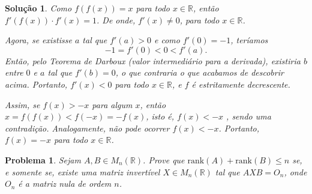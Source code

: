 \documentclass{hipatia}
\newtheorem{problem*}{Problema}
\newtheorem*{solution*}{Solução}
\begin{document}
\begin{solution*}

Como $f(f(x)) = x$ para todo $x \in \mathbb{R}$, 
então $f'(f(x)) \cdot f'(x) = 1$. De onde, $f'(x) \neq 0$, para todo $x \in \mathbb{R}$. 

\vspace{0.3cm}

Agora, se existisse $a$ tal que $f'(a) > 0$ e 
como $f'(0) = -1$, teríamos $$-1 = f'(0) < 0 < f'(a).$$ 
Então, pelo Teorema de Darboux 
(valor intermediário para a derivada), existiria $b$ entre $0$ e $a$ tal que $f'(b) = 0$, o que contraria o que acabamos de descobrir acima. Portanto, $f'(x) < 0$ para todo $x \in \mathbb{R}$, e $f$ é estritamente decrescente. 

\vspace{0.3cm}

Assim, se $f(x) > -x$ para algum $x$, então $x = f(f(x)) < f(-x) = -f(x)$, isto é, $f(x) < -x$ , sendo uma contradição. Analogamente, não pode ocorrer $f(x) < -x$. Portanto, $f(x) = -x$ para todo $x \in \mathbb{R}$. 

\end{solution*}


\begin{problem*}
Sejam $A, B \in M_n(\mathbb{R})$. Prove que $\mbox{rank}(A) + \mbox{rank}(B) \leq n$ se, e somente se, existe uma matriz invertível $X \in M_n(\mathbb{R})$ tal que $AXB = O_n$, onde $O_n$ é a matriz nula de ordem $n$.
	
\end{problem*}
\end{document}
